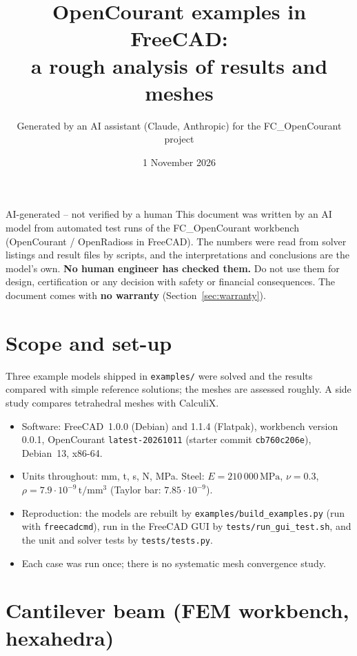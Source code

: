 \documentclass[11pt,a4paper]{article}
\title{OpenCourant examples in FreeCAD:\\ a rough analysis of results and meshes}
\author{Generated by an AI assistant (Claude, Anthropic) for the FC\_OpenCourant project}
\date{1 November 2026}
\newcommand{\unit}[1]{\,\mathrm{#1}}
\begin{document}
\maketitle
\thispagestyle{fancy}

\begin{notice}{AI-generated -- not verified by a human}
This document was written by an AI model from automated test runs of the FC\_OpenCourant
workbench (OpenCourant / OpenRadioss in FreeCAD). The numbers were read from solver listings and
result files by scripts, and the interpretations and conclusions are the model's own.
\textbf{No human engineer has checked them.} Do not use them for design, certification or any
decision with safety or financial consequences. The document comes with \textbf{no warranty}
(Section~\ref{sec:warranty}).
\end{notice}

\section{Scope and set-up}

Three example models shipped in \texttt{examples/} were solved and the results compared with
simple reference solutions; the meshes are assessed roughly. A side study compares tetrahedral
meshes with CalculiX.

\begin{itemize}
  \item Software: FreeCAD~1.0.0 (Debian) and 1.1.4 (Flatpak), workbench version 0.0.1,
        OpenCourant \texttt{latest-20261011} (starter commit \texttt{cb760c206e}), Debian~13, x86-64.
  \item Units throughout: mm, t, s, N, MPa. Steel: $E=210\,000\unit{MPa}$, $\nu=0.3$,
        $\rho=7.9\cdot10^{-9}\unit{t/mm^3}$ (Taylor bar: $7.85\cdot10^{-9}$).
  \item Reproduction: the models are rebuilt by \texttt{examples/\allowbreak build\_examples.py}
        (run with \texttt{freecadcmd}), run in the FreeCAD GUI by \texttt{tests/\allowbreak run\_gui\_test.sh},
        and the unit and solver tests by \texttt{tests/\allowbreak tests.py}.
  \item Each case was run once; there is no systematic mesh convergence study.
\end{itemize}

\section{Cantilever beam (FEM workbench, hexahedra)}
\end{document}
